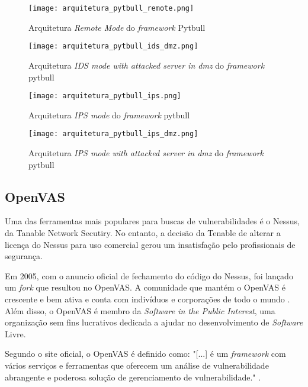 \begin{figure}[!htb]
    \centering
    \caption{Arquitetura \textit{Remote Mode} do \textit{framework} Pytbull}
    \texttt{[image: arquitetura\_pytbull\_remote.png]}
    \label{fig:pytbull-remote}
\end{figure}

\begin{figure}[!htb]
    \centering
    \caption{Arquitetura \textit{IDS mode with attacked server in dmz} do \textit{framework} pytbull}
    \texttt{[image: arquitetura\_pytbull\_ids\_dmz.png]}
    \label{fig:pytbull-ids-dmz}
\end{figure}

\begin{figure}[!htb]
    \centering
    \caption{Arquitetura \textit{IPS mode} do \textit{framework} pytbull}
    \texttt{[image: arquitetura\_pytbull\_ips.png]}
    \label{fig:pytbull-ips}
\end{figure}

\begin{figure}[!htb]
    \centering
    \caption{Arquitetura \textit{IPS mode with attacked server in dmz} do \textit{framework} pytbull}
    \texttt{[image: arquitetura\_pytbull\_ips\_dmz.png]}
    \label{fig:pytbull-ips-dmz}
\end{figure}

\subsection{OpenVAS} \label{sec:openvas}

Uma das ferramentas mais populares para buscas de vulnerabilidades é o Nessus, da Tanable Network Secutiry. No entanto, a decisão da Tenable de alterar a licença do Nessus para uso comercial gerou um insatisfação pelo profissionais de segurança. 

Em 2005, com o anuncio oficial de fechamento do código do Nessus, foi lançado um \textit{fork} que resultou no OpenVAS. A comunidade que mantém o OpenVAS é crescente e bem ativa e conta com indivíduos e corporações de todo o mundo \cite{openvas:tim}. Além disso, o OpenVAS é membro da \textit{Software in the Public Interest}, uma organização sem fins lucrativos dedicada a ajudar no desenvolvimento de \textit{Software} Livre.

Segundo o site oficial, o OpenVAS é definido como: "[...] é um \textit{framework} com vários serviços e ferramentas que oferecem um análise de vulnerabilidade abrangente e poderosa solução de gerenciamento de vulnerabilidade." \cite{openvas}.

